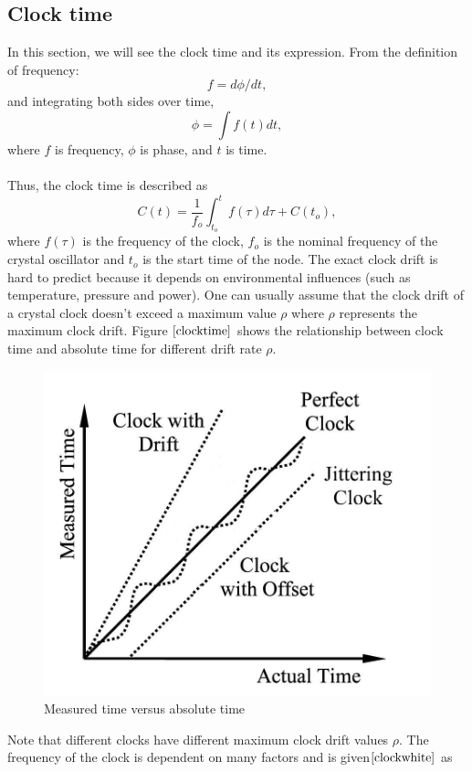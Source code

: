 \documentclass[a4paper,10pt]{report}
\begin{document}
\subsection{\textbf{Clock time}}
In this section, we will see the clock time and its expression. From the definition of frequency:
\begin{equation}
f = d\phi/dt \label{freq_defn} ,
\end{equation}
and integrating both sides over time,
 \begin{equation}
\phi =\int f(t)dt ,
 \end{equation}
where $f$ is frequency, $\phi$ is phase, and $t$ is time.\paragraph*{} \noindent
Thus, the clock time is described as
\begin{equation}
C(t) = \dfrac{1}{f_o}\int_{t_o}^{t} {f(\tau)d\tau} + C(t_o) ,
\label{clock}
\end{equation}
where $f(\tau)$ is the frequency of the clock, $f_o$ is the nominal frequency of the crystal oscillator and $t_o$ is the start time of
the node. The exact clock drift is hard to predict because it depends on environmental influences (such as temperature, pressure
and power). One can usually assume that the clock drift of a crystal clock doesn't exceed a maximum value $\rho$ where $\rho$ represents the maximum clock drift. Figure $\ref{clocktime}$ shows the relationship between clock time and absolute time for different drift rate $\rho$.
\begin{figure}
\centering
\includegraphics[width=0.5 \textwidth]{actualvsmeasuredtime}
\caption{Measured time versus absolute time} \label{clocktime}
\end{figure}
Note that different clocks have different maximum clock drift values
$\rho$. The frequency of the clock is dependent on many factors and is given$\cite{clockwhite}$ as
\end{document}
